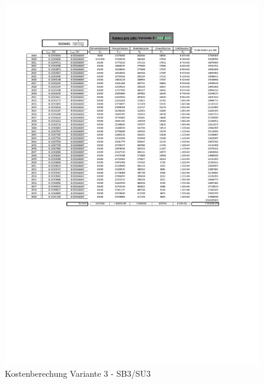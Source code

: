 \begin{figure}[h!]
	\centering
	\includegraphics[width=\textwidth]{figures/Anhang/f-00-A-V3-B3-U3}
	\caption{Kostenberechung Variante 3 - SB3/SU3}
\end{figure}
%

